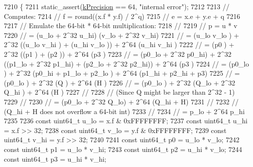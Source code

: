 \begin{DoxyCode}
7210     \{
7211         static\_assert(\hyperlink{structnlohmann_1_1detail_1_1dtoa__impl_1_1diyfp_a03682754b06ed4f30b263119eecc2d52}{kPrecision} == 64, \textcolor{stringliteral}{"internal error"});
7212 
7213         \textcolor{comment}{// Computes:}
7214         \textcolor{comment}{//  f = round((x.f * y.f) / 2^q)}
7215         \textcolor{comment}{//  e = x.e + y.e + q}
7216 
7217         \textcolor{comment}{// Emulate the 64-bit * 64-bit multiplication:}
7218         \textcolor{comment}{//}
7219         \textcolor{comment}{// p = u * v}
7220         \textcolor{comment}{//   = (u\_lo + 2^32 u\_hi) (v\_lo + 2^32 v\_hi)}
7221         \textcolor{comment}{//   = (u\_lo v\_lo         ) + 2^32 ((u\_lo v\_hi         ) + (u\_hi v\_lo         )) + 2^64 (u\_hi v\_hi 
              )}
7222         \textcolor{comment}{//   = (p0                ) + 2^32 ((p1                ) + (p2                )) + 2^64 (p3        
              )}
7223         \textcolor{comment}{//   = (p0\_lo + 2^32 p0\_hi) + 2^32 ((p1\_lo + 2^32 p1\_hi) + (p2\_lo + 2^32 p2\_hi)) + 2^64 (p3        
              )}
7224         \textcolor{comment}{//   = (p0\_lo             ) + 2^32 (p0\_hi + p1\_lo + p2\_lo                      ) + 2^64 (p1\_hi +
       p2\_hi + p3)}
7225         \textcolor{comment}{//   = (p0\_lo             ) + 2^32 (Q                                          ) + 2^64 (H         
              )}
7226         \textcolor{comment}{//   = (p0\_lo             ) + 2^32 (Q\_lo + 2^32 Q\_hi                           ) + 2^64 (H         
              )}
7227         \textcolor{comment}{//}
7228         \textcolor{comment}{// (Since Q might be larger than 2^32 - 1)}
7229         \textcolor{comment}{//}
7230         \textcolor{comment}{//   = (p0\_lo + 2^32 Q\_lo) + 2^64 (Q\_hi + H)}
7231         \textcolor{comment}{//}
7232         \textcolor{comment}{// (Q\_hi + H does not overflow a 64-bit int)}
7233         \textcolor{comment}{//}
7234         \textcolor{comment}{//   = p\_lo + 2^64 p\_hi}
7235 
7236         \textcolor{keyword}{const} uint64\_t u\_lo = x.f & 0xFFFFFFFF;
7237         \textcolor{keyword}{const} uint64\_t u\_hi = x.f >> 32;
7238         \textcolor{keyword}{const} uint64\_t v\_lo = y.f & 0xFFFFFFFF;
7239         \textcolor{keyword}{const} uint64\_t v\_hi = y.f >> 32;
7240 
7241         \textcolor{keyword}{const} uint64\_t p0 = u\_lo * v\_lo;
7242         \textcolor{keyword}{const} uint64\_t p1 = u\_lo * v\_hi;
7243         \textcolor{keyword}{const} uint64\_t p2 = u\_hi * v\_lo;
7244         \textcolor{keyword}{const} uint64\_t p3 = u\_hi * v\_hi;

\end{DoxyCode}
